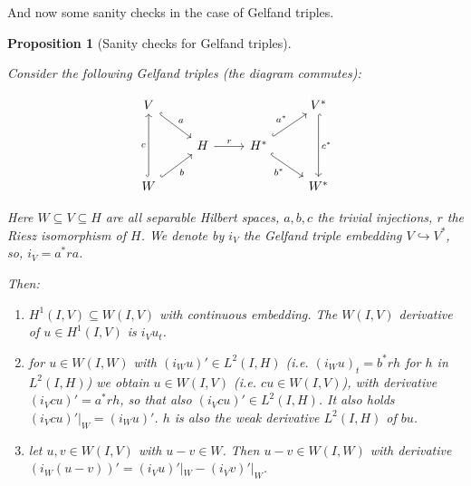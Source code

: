 \documentclass[english,a4paper,12pt,oneside]{scrbook}
\theoremstyle{break}
\newtheorem{prop}[equation]{Proposition}
\theoremstyle{remark}
\newcommand{\emb}{\hookrightarrow}
\begin{document}
And now some sanity checks in the case of Gelfand triples. 

\begin{prop}[Sanity checks for Gelfand triples]
\label{prop:sanity}

Consider the following Gelfand triples (the diagram commutes):

\[\begin{tikzcd}
	{V} &&& {V^*} \\
	& H & {H^*} \\
	{W} &&& {W^*}
	\arrow["c", hook, from=3-1, to=1-1]
	\arrow["a", hook, from=1-1, to=2-2]
	\arrow["b"', hook, from=3-1, to=2-2]
	\arrow["{a^*}", hook, from=2-3, to=1-4]
	\arrow["r", from=2-2, to=2-3]
	\arrow["{b^*}"', hook, from=2-3, to=3-4]
	\arrow["{c^*}", hook, from=1-4, to=3-4]
\end{tikzcd}\]

Here $W\subseteq V \subseteq H$ are all separable Hilbert spaces, $a,b,c$ the trivial injections, $r$ the Riesz isomorphism of $H$. We denote by $i_V$ the Gelfand triple embedding $V\emb V^*$, so, $i_V=a^*ra$.

Then:

\begin{enumerate}
	\item $H^1(I,V)\subseteq W(I,V)$ with continuous embedding. The $W(I,V)$ derivative of $u \in H^1(I,V)$ is $i_V u_t$.
	\item for $u \in W(I,W)$ with $(i_W u)'\in L^2(I,H)$ (i.e. $(i_W u)_t = b^*r h$ for $h$ in $L^2(I,H)$) we obtain $u \in W(I,V)$ (i.e. $cu \in W(I,V)$), with derivative $(i_V cu)'=a^*r h$, so that also $(i_V cu)' \in L^2(I,H)$. It also holds $(i_V cu)'|_W = (i_W u)'$. $h$ is also the weak derivative $L^2(I,H)$ of $bu$.
	\item let $u, v \in W(I,V)$ with $u-v \in W$. Then $u-v \in W(I,W)$ with derivative $(i_W(u-v))'=(i_V u)'|_W-(i_V v)'|_W$.
\end{enumerate}

\end{prop}
\end{document}
